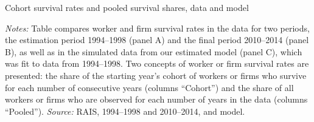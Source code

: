 \begin{table}[!htb]
  \centering
  \caption{Cohort survival rates and pooled survival shares, data and model\label{tab:survival_rates}}
  \pretabvspace
  
  \posttabvspace
  \begin{minipage}[t]{1\columnwidth}%
    \begin{spacing}{0.75}
      \emph{\scriptsize{}Notes:}{\scriptsize{} Table compares worker and firm survival rates in the data for two periods, the estimation period 1994--1998 (panel A) and the final period 2010--2014 (panel B), as well as in the simulated data from our estimated model (panel C), which was fit to data from 1994--1998. Two concepts of worker or firm survival rates are presented: the share of the starting year's cohort of workers or firms who survive for each number of consecutive years (columns ``Cohort'') and the share of all workers or firms who are observed for each number of years in the data (columns ``Pooled''). %
      \emph{\scriptsize{}Source:} RAIS, 1994--1998 and 2010--2014, and model.}
    \end{spacing}
  \end{minipage}
\end{table}

